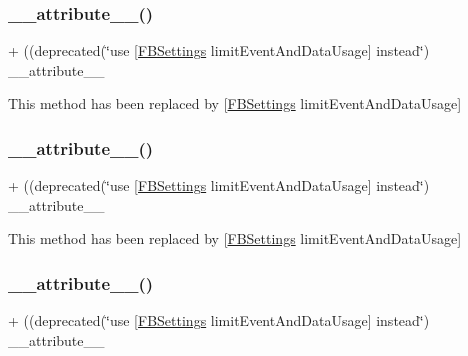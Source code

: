 \subsubsection{\texorpdfstring{\+\_\+\+\_\+attribute\+\_\+\+\_\+()}{\_\_attribute\_\_()}\hspace{0.1cm}{\footnotesize\ttfamily [3/5]}}
{\footnotesize\ttfamily + ((deprecated(\char`\"{}use \mbox{[}\hyperlink{interfaceFBSettings}{F\+B\+Settings} limit\+Event\+And\+Data\+Usage\mbox{]} instead\char`\"{}) \+\_\+\+\_\+attribute\+\_\+\+\_\+ \begin{DoxyParamCaption}{ }\end{DoxyParamCaption}}

This method has been replaced by \mbox{[}\hyperlink{interfaceFBSettings}{F\+B\+Settings} limit\+Event\+And\+Data\+Usage\mbox{]} \mbox{\label{interfaceFBAppEvents_a395c574fef6bbde5ac4b98b6cf497b8c}} 
\subsubsection{\texorpdfstring{\+\_\+\+\_\+attribute\+\_\+\+\_\+()}{\_\_attribute\_\_()}\hspace{0.1cm}{\footnotesize\ttfamily [4/5]}}
{\footnotesize\ttfamily + ((deprecated(\char`\"{}use \mbox{[}\hyperlink{interfaceFBSettings}{F\+B\+Settings} limit\+Event\+And\+Data\+Usage\mbox{]} instead\char`\"{}) \+\_\+\+\_\+attribute\+\_\+\+\_\+ \begin{DoxyParamCaption}{ }\end{DoxyParamCaption}}

This method has been replaced by \mbox{[}\hyperlink{interfaceFBSettings}{F\+B\+Settings} limit\+Event\+And\+Data\+Usage\mbox{]} \mbox{\label{interfaceFBAppEvents_a395c574fef6bbde5ac4b98b6cf497b8c}} 
\subsubsection{\texorpdfstring{\+\_\+\+\_\+attribute\+\_\+\+\_\+()}{\_\_attribute\_\_()}\hspace{0.1cm}{\footnotesize\ttfamily [5/5]}}
{\footnotesize\ttfamily + ((deprecated(\char`\"{}use \mbox{[}\hyperlink{interfaceFBSettings}{F\+B\+Settings} limit\+Event\+And\+Data\+Usage\mbox{]} instead\char`\"{}) \+\_\+\+\_\+attribute\+\_\+\+\_\+ \begin{DoxyParamCaption}{ }\end{DoxyParamCaption}}

